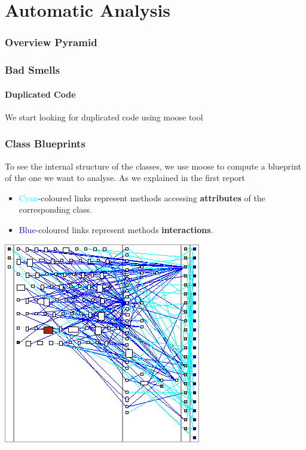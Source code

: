 \documentclass[11pt,a4paper]{report}
\begin{document}
 
\newpage
\part{Automatic Analysis}
\section{Overview Pyramid}
\section{Bad Smells}
\subsection{Duplicated Code}
We start looking for duplicated code using moose tool
\section{Class Blueprints}
To see the internal structure of the classes, we use moose to compute a blueprint of the one we want to analyse. As we explained in the first report
\begin{itemize}
	\item \textcolor{cyan}{Cyan}-coloured links represent methods accessing \textbf{attributes} of the corresponding class.
	\item \textcolor{blue}{Blue}-coloured links represent methods \textbf{interactions}. 
\end{itemize}
\includegraphics[width=\textwidth]{GLM_Presentation_blueprint}
\end{document}
